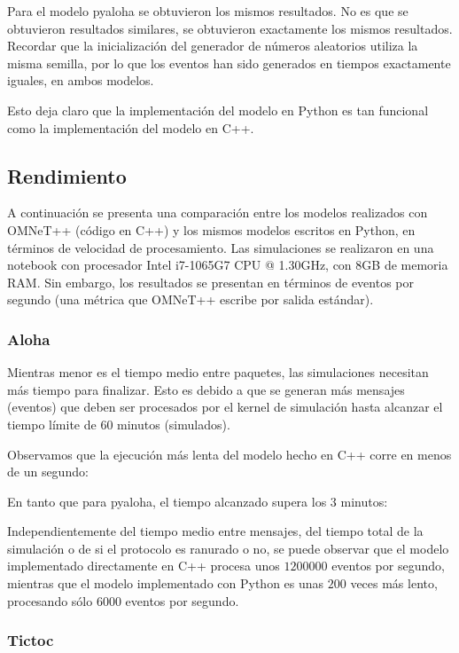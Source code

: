 \documentclass[]{article}
\begin{document}
Para el modelo pyaloha se obtuvieron los mismos resultados. No es que se
obtuvieron resultados similares, se obtuvieron exactamente los mismos
resultados. Recordar que la inicialización del generador de números aleatorios
utiliza la misma semilla, por lo que los eventos han sido generados en tiempos
exactamente iguales, en ambos modelos.

Esto deja claro que la implementación del modelo en Python es tan funcional
como la implementación del modelo en C++.

\subsection{Rendimiento}

A continuación se presenta una comparación entre los modelos realizados con
OMNeT++ (código en C++) y los mismos modelos escritos en Python, en términos de
velocidad de procesamiento. Las simulaciones se realizaron en una notebook con
procesador Intel i7-1065G7 CPU @ 1.30GHz, con 8GB de memoria RAM. Sin embargo,
los resultados se presentan en términos de eventos por segundo (una métrica que
OMNeT++ escribe por salida estándar).

\subsubsection{Aloha}

Mientras menor es el tiempo medio entre paquetes, las simulaciones necesitan
más tiempo para finalizar. Esto es debido a que se generan más mensajes
(eventos) que deben ser procesados por el kernel de simulación hasta alcanzar
el tiempo límite de 60 minutos (simulados).

Observamos que la ejecución más lenta del modelo hecho en C++ corre en menos de
un segundo:


En tanto que para pyaloha, el tiempo alcanzado supera los 3 minutos:


Independientemente del tiempo medio entre mensajes, del tiempo total de la
simulación o de si el protocolo es ranurado o no, se puede observar que el
modelo implementado directamente en C++ procesa unos $1200000$ eventos por
segundo, mientras que el modelo implementado con Python es unas $200$ veces más
lento, procesando sólo $6000$ eventos por segundo.

\subsubsection{Tictoc}
\end{document}
